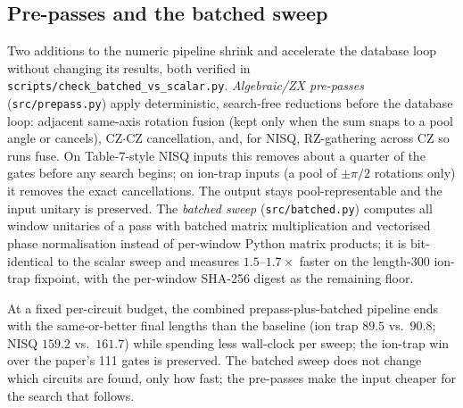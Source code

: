 \documentclass[11pt,a4paper]{article}
\begin{document}
\subsection{Pre-passes and the batched sweep}
\label{sec:prepass}
Two additions to the numeric pipeline shrink and accelerate the database
loop without changing its results, both verified in
\texttt{scripts/check\_batched\_vs\_scalar.py}. \emph{Algebraic/ZX
pre-passes} (\texttt{src/prepass.py}) apply deterministic, search-free
reductions before the database loop: adjacent same-axis rotation fusion
(kept only when the sum snaps to a pool angle or cancels), CZ$\cdot$CZ
cancellation, and, for NISQ, RZ-gathering across CZ so runs fuse. On
Table-7-style NISQ inputs this removes about a quarter of the gates before
any search begins; on ion-trap inputs (a pool of $\pm\pi/2$ rotations only)
it removes the exact cancellations. The output stays pool-representable and
the input unitary is preserved. The \emph{batched sweep}
(\texttt{src/batched.py}) computes all window unitaries of a pass with
batched matrix multiplication and vectorised phase normalisation instead of
per-window Python matrix products; it is bit-identical to the scalar sweep
and measures $1.5$--$1.7\times$ faster on the length-300 ion-trap fixpoint,
with the per-window SHA-256 digest as the remaining floor.

At a fixed per-circuit budget, the combined prepass-plus-batched pipeline
ends with the same-or-better final lengths than the baseline (ion trap
$89.5$ vs.\ $90.8$; NISQ $159.2$ vs.\ $161.7$) while spending less wall-clock
per sweep; the ion-trap win over the paper's 111 gates is preserved. The
batched sweep does not change which circuits are found, only how fast; the
pre-passes make the input cheaper for the search that follows.
\end{document}
